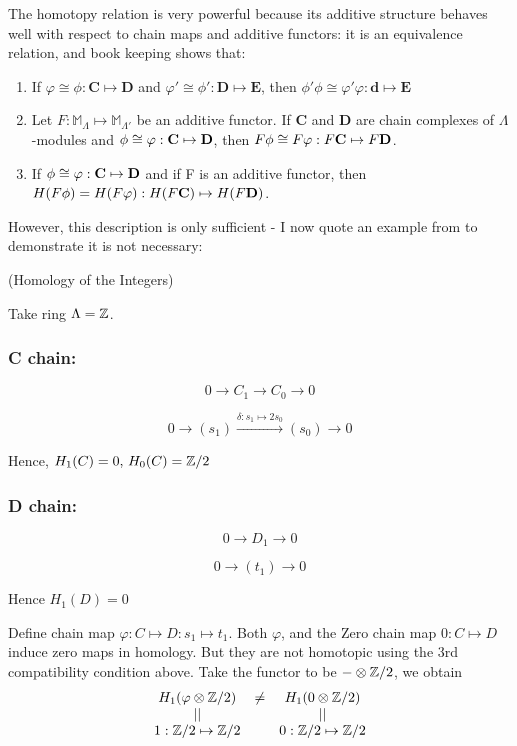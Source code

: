 The homotopy relation is very powerful because its additive
structure behaves well with respect to chain maps and additive
functors: it is an equivalence relation, and book keeping shows
that:
\begin{enumerate}
    \item If $\varphi \cong \phi:\textbf{C}\mapsto\textbf{D}$ and
    $\varphi' \cong \phi':\textbf{D}\mapsto\textbf{E}$, then
    $\phi'\phi\cong\varphi'\varphi: \mathbf{d}\mapsto \mathbf{E}$
    \item Let $F: \mathbb M_\Lambda \mapsto \mathbb M_{\Lambda'}$
    be an additive functor. If $\textbf{C}$ and $\textbf{D}$ are
    chain complexes of $\Lambda$-modules and $\phi\cong \varphi
    :\textbf{C} \mapsto \textbf D$, then $F\phi \cong
    F\varphi:F\textbf C \mapsto F\textbf D$.
    \item If $\phi \cong \varphi: \textbf C \mapsto \textbf D$ and
    if F is an additive functor, then $H(F\phi) = H(F\varphi):
    H(F\textbf C) \mapsto H(F \textbf D)$.
\end{enumerate}
However, this description is only sufficient - I now quote an
example from \cite{hilton} to demonstrate it is not necessary:



\begin{example} (Homology of the Integers\label{df1.2.4})

Take ring $\Lambda = \mathbb Z$.
\subsubsection*{C chain:}

$$0\rightarrow C_1\rightarrow C_0\rightarrow 0$$

$$0\rightarrow (s_1) \xrightarrow{\delta:s_1\mapsto 2s_0} (s_0)
\rightarrow 0$$

Hence, $H_1(C) = 0,\, H_0(C) = \mathbb Z/2$

\subsubsection*{D chain:}

$$0\rightarrow D_1 \rightarrow 0$$

$$0\rightarrow (t_1) \rightarrow 0$$

Hence $H_1(D) = 0$

Define chain map $\varphi:C\mapsto D:s_1\mapsto t_1$. Both
$\varphi$, and the Zero chain map $0:C\mapsto D$ induce zero maps
in homology. But they are not homotopic using the 3rd
compatibility condition above. Take the functor to be $-\otimes
\mathbb Z/2$, we obtain
$$\begin{array}{ccc}
  H_1(\varphi\otimes \mathbb Z/2) & \neq & H_1(0\otimes \mathbb Z/2) \\
  || &  & || \\
  1:\mathbb Z/2 \mapsto \mathbb Z/2 &  & 0:\mathbb Z/2 \mapsto \mathbb Z/2 \\
\end{array}$$
\end{example}



